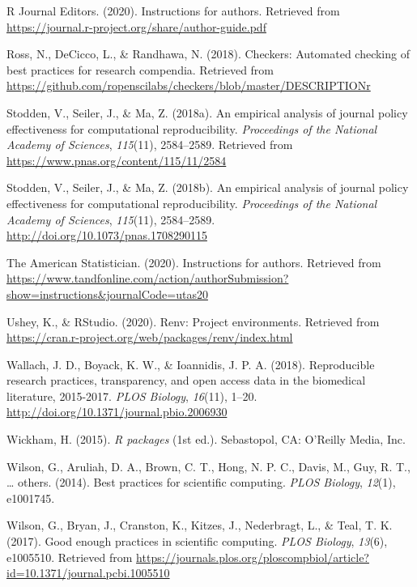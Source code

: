 \documentclass[12pt,twoside]{reedthesis}
\begin{document}
\leavevmode\hypertarget{ref-r-journal}{}%
R Journal Editors. (2020). Instructions for authors. Retrieved from \url{https://journal.r-project.org/share/author-guide.pdf}

\leavevmode\hypertarget{ref-R-checkers}{}%
Ross, N., DeCicco, L., \& Randhawa, N. (2018). Checkers: Automated checking of best practices for research compendia. Retrieved from \url{https://github.com/ropenscilabs/checkers/blob/master/DESCRIPTIONr}

\leavevmode\hypertarget{ref-policy-effectiveness}{}%
Stodden, V., Seiler, J., \& Ma, Z. (2018a). An empirical analysis of journal policy effectiveness for computational reproducibility. \emph{Proceedings of the National Academy of Sciences}, \emph{115}(11), 2584--2589. Retrieved from \url{https://www.pnas.org/content/115/11/2584}

\leavevmode\hypertarget{ref-Stodden2584}{}%
Stodden, V., Seiler, J., \& Ma, Z. (2018b). An empirical analysis of journal policy effectiveness for computational reproducibility. \emph{Proceedings of the National Academy of Sciences}, \emph{115}(11), 2584--2589. \url{http://doi.org/10.1073/pnas.1708290115}

\leavevmode\hypertarget{ref-ams-guide}{}%
The American Statistician. (2020). Instructions for authors. Retrieved from \url{https://www.tandfonline.com/action/authorSubmission?show=instructions\&journalCode=utas20}

\leavevmode\hypertarget{ref-R-renv}{}%
Ushey, K., \& RStudio. (2020). Renv: Project environments. Retrieved from \url{https://cran.r-project.org/web/packages/renv/index.html}

\leavevmode\hypertarget{ref-plos-biology}{}%
Wallach, J. D., Boyack, K. W., \& Ioannidis, J. P. A. (2018). Reproducible research practices, transparency, and open access data in the biomedical literature, 2015-2017. \emph{PLOS Biology}, \emph{16}(11), 1--20. \url{http://doi.org/10.1371/journal.pbio.2006930}

\leavevmode\hypertarget{ref-hadley-packages}{}%
Wickham, H. (2015). \emph{R packages} (1st ed.). Sebastopol, CA: O'Reilly Media, Inc.

\leavevmode\hypertarget{ref-wilson2014best}{}%
Wilson, G., Aruliah, D. A., Brown, C. T., Hong, N. P. C., Davis, M., Guy, R. T., \ldots{} others. (2014). Best practices for scientific computing. \emph{PLOS Biology}, \emph{12}(1), e1001745.

\leavevmode\hypertarget{ref-wilson2017good}{}%
Wilson, G., Bryan, J., Cranston, K., Kitzes, J., Nederbragt, L., \& Teal, T. K. (2017). Good enough practices in scientific computing. \emph{PLOS Biology}, \emph{13}(6), e1005510. Retrieved from \url{https://journals.plos.org/ploscompbiol/article?id=10.1371/journal.pcbi.1005510}
\end{document}
